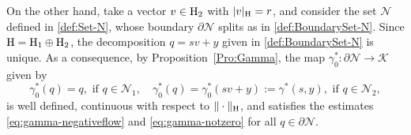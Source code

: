 \documentclass{article}
\newcommand{\boK}{\mathcal{K}}
\newcommand{\boN}{\mathcal{N}}
\newcommand{\Hilb}{{\textnormal H}}
\theoremstyle{definition}
\begin{document}
On the other hand, take a vector $v\in\Hilb_2$ with $|v|_\Hilb=r$, and consider the set $\boN$ defined in \eqref{def:Set-N}, whose boundary $\partial\boN$ splits as in \eqref{def:BoundarySet-N}. Since $\Hilb=\Hilb_1\oplus\Hilb_2$, the decomposition $q=sv+y$ given in \eqref{def:BoundarySet-N} is unique. As a consequence, by Proposition~\ref{Pro:Gamma}, the map $\gamma_0^*:\partial\boN\to\boK$ given by
\begin{equation}\label{def:gamma0}
    \gamma_0^*(q)=q,\text{ if }q\in\boN_1,\quad\gamma_0^*(q)=\gamma_0^*(sv+y):=\gamma^*(s,y),\text{ if }q\in \boN_2,
\end{equation}
is well defined, continuous with respect to $\|\cdot\|_\Hilb$, and satisfies the estimates \eqref{eq:gamma-negativeflow} and \eqref{eq:gamma-notzero} for all $q\in\partial\boN$.
\end{document}
